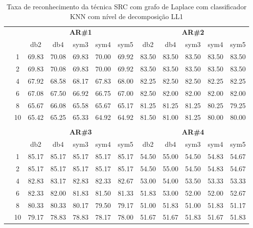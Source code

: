 \begin{table}[H]
	\centering
    \normalsize
	\caption{Taxa de reconhecimento da técnica SRC com grafo de Laplace com classificador KNN com nível de decomposição LL1}
	\begin{tabular}{|c|c|c c c c c|c c c c c|}
\cline{3-12}
\multicolumn{2}{c|}{\multirow{2}{*}{}} & \multicolumn{5}{c|}{\textbf{AR\#1}}  & \multicolumn{5}{c|}{\textbf{AR\#2}} \\\cline{3-12}

\multicolumn{2}{c|}{}  & db2 & db4 & sym3 & sym4 & sym5 & db2 & db4& sym3 & sym4 & sym5 \\\hline

\multicolumn{1}{|c|}{ \multirow{5}{*}{\rotatebox[origin=c]{90}{\textbf{K-vizinhos}}} }
&1	&69.83	&70.08	&69.83	&70.00	&69.92	&83.50	&83.50	&83.50	&83.50	&83.50\\\cline{2-12}
&2	&69.83	&70.08	&69.83	&70.00	&69.92	&83.50	&83.50	&83.50	&83.50	&83.50\\\cline{2-12}
&4	&67.92	&68.58	&68.17	&67.83	&68.00	&82.25	&82.50	&82.50	&82.25	&82.25\\\cline{2-12}
&6	&67.08	&67.50	&66.92	&66.75	&67.00	&82.50	&82.00	&82.00	&82.00	&82.00\\\cline{2-12}
&8	&65.67	&66.08	&65.58	&65.67	&65.17	&81.25	&81.25	&81.25	&80.25	&79.25\\\cline{2-12}
&10	&65.42	&65.25	&65.33	&64.92	&64.92	&81.50	&81.00	&81.25	&80.00	&80.00\\ \midrule
\multicolumn{12}{c}{}\\ 




\cline{3-12}
\multicolumn{2}{c}{} & \multicolumn{5}{|c|}{\textbf{AR\#3}}  & \multicolumn{5}{c|}{\textbf{AR\#4}} \\\cline{3-12}
\multicolumn{2}{c}{}  & \multicolumn{1}{|c}{db2} & db4 & sym3 & sym4 & sym5 & db2 & db4& sym3 & sym4 & sym5 \\\hline
\multicolumn{1}{|c|}{ \multirow{6}{*}{\rotatebox[origin=c]{90}{\textbf{K-vizinhos}}} }
&1	&85.17	&85.17	&85.17	&85.17	&85.17	&54.50	&55.00	&54.50	&54.83	&54.67\\\cline{2-12}
&2	&85.17	&85.17	&85.17	&85.17	&85.17	&54.50	&55.00	&54.50	&54.83	&54.67\\\cline{2-12}
&4	&82.83	&83.17	&82.83	&82.33	&82.67	&53.00	&54.00	&53.50	&53.33	&53.33\\\cline{2-12}
&6	&82.33	&82.00	&81.83	&81.50	&81.33	&51.83	&53.00	&52.00	&52.00	&52.67\\\cline{2-12}
&8	&80.33	&80.33	&80.17	&79.50	&79.17	&51.00	&51.83	&51.00	&51.83	&51.17\\\cline{2-12}
&10	&79.17	&78.83	&78.83	&78.17	&78.00	&51.67	&51.67	&51.83	&51.67	&51.83%


\\\midrule
\end{tabular}

\end{table}
